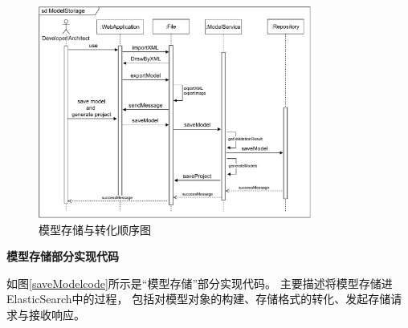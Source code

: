 \begin{figure}[!htbp] %
    \centering %
    \includegraphics[width=0.8\textwidth]{FIGs/chapter4/sdModelStorage.pdf} %
    \caption{模型存储与转化顺序图} %
    \label{sdModelStorage} %
\end{figure}%

\newpage
\textbf{模型存储部分实现代码}

如图\ref{saveModelcode}所示是“模型存储”部分实现代码。
主要描述将模型存储进ElasticSearch中的过程，
包括对模型对象的构建、存储格式的转化、发起存储请求与接收响应。


